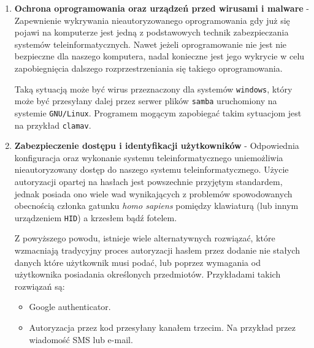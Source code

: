 \documentclass[12pt,a4paper]{article}
\begin{document}
\begin{enumerate}
    \item \textbf{Ochrona oprogramowania oraz urządzeń przed wirusami i malware} -
        Zapewnienie wykrywania nieautoryzowanego oprogramowania gdy już się
        pojawi na komputerze jest jedną z podstawowych technik zabezpieczania
        systemów teleinformatycznych. Nawet jeżeli oprogramowanie nie jest nie
        bezpieczne dla naszego komputera, nadal konieczne jest jego wykrycie w
        celu zapobiegnięcia dalszego rozprzestrzeniania się takiego
        oprogramowania.

        Taką sytuacją może być wirus przeznaczony dla systemów \texttt{windows}, 
        który może być przesyłany dalej przez serwer plików \texttt{samba}
        uruchomiony na systemie \texttt{GNU/Linux}. Programem mogącym zapobiegać
        takim sytuacjom jest na przykład \texttt{clamav}.
    \item \textbf{Zabezpieczenie dostępu i identyfikacji użytkowników} -
        Odpowiednia konfiguracja oraz wykonanie systemu teleinformatycznego
        uniemożliwia nieautoryzowany dostęp do naszego systemu
        teleinformatycznego. Użycie autoryzacji opartej na hasłach jest
        powszechnie przyjętym standardem, jednak posiada ono wiele wad
        wynikających z problemów spowodowanych obecnością członka gatunku
        \emph{homo sapiens} pomiędzy klawiaturą (lub innym urządzeniem
        \texttt{HID}) a krzesłem bądź fotelem.
        
        Z powyższego powodu, istnieje wiele alternatywnych rozwiązać, które
        wzmacniają tradycyjny proces autoryzacji hasłem przez dodanie nie
        stałych danych które użytkownik musi podać, lub poprzez wymagania od
        użytkownika posiadania określonych przedmiotów. Przykładami takich
        rozwiązań są:
        \begin{itemize}
            \item Google authenticator.
            \item Autoryzacja przez kod przesyłany kanałem trzecim. Na przykład 
              przez wiadomość SMS lub e-mail.
        \end{itemize}


\end{enumerate}
\end{document}
